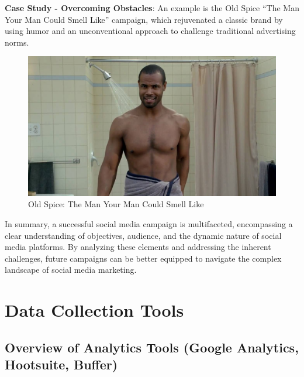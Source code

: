 \documentclass[
]{book}
\begin{document}
\textbf{Case Study - Overcoming Obstacles}: An example is the Old Spice ``The Man Your Man Could Smell Like'' campaign, which rejuvenated a classic brand by using humor and an unconventional approach to challenge traditional advertising norms.

\begin{figure}
\centering
\includegraphics[width=1\textwidth,height=\textheight]{images/oldspice.jpg}
\caption{Old Spice: The Man Your Man Could Smell Like}
\end{figure}

In summary, a successful social media campaign is multifaceted, encompassing a clear understanding of objectives, audience, and the dynamic nature of social media platforms. By analyzing these elements and addressing the inherent challenges, future campaigns can be better equipped to navigate the complex landscape of social media marketing.

\hypertarget{data-collection-tools}{%
\chapter{Data Collection Tools}\label{data-collection-tools}}

\hypertarget{overview-of-analytics-tools-google-analytics-hootsuite-buffer}{%
\section*{Overview of Analytics Tools (Google Analytics, Hootsuite, Buffer)}\label{overview-of-analytics-tools-google-analytics-hootsuite-buffer}}
\end{document}
